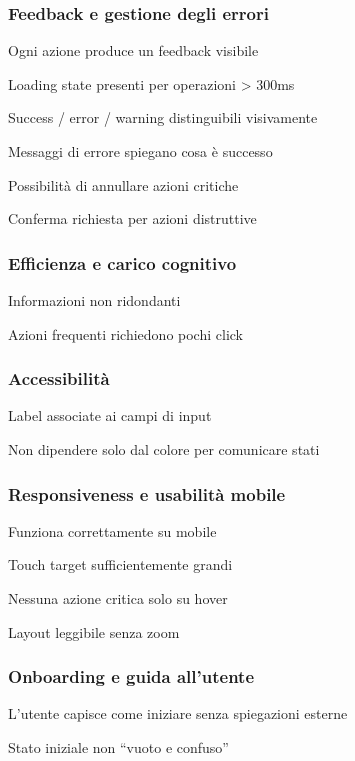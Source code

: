 \subsubsection{Feedback e gestione degli errori}
\begin{todolist}
	\item Ogni azione produce un feedback visibile
	\item Loading state presenti per operazioni > 300ms
	\item Success / error / warning distinguibili visivamente
	\item Messaggi di errore spiegano cosa è successo
	\item Possibilità di annullare azioni critiche
	\item Conferma richiesta per azioni distruttive
\end{todolist}
\subsubsection{Efficienza e carico cognitivo}
\begin{todolist}
\item Informazioni non ridondanti
\item Azioni frequenti richiedono pochi click
\end{todolist}
\subsubsection{Accessibilità}
\begin{todolist}
	\item Label associate ai campi di input
	\item Non dipendere solo dal colore per comunicare stati
\end{todolist}
\subsubsection{Responsiveness e usabilità mobile}
\begin{todolist}
	\item Funziona correttamente su mobile
	\item Touch target sufficientemente grandi
	\item Nessuna azione critica solo su hover
	\item Layout leggibile senza zoom
\end{todolist}
\subsubsection{Onboarding e guida all'utente}
\begin{todolist}
	\item L'utente capisce come iniziare senza spiegazioni esterne
	\item Stato iniziale non ``vuoto e confuso''
\end{todolist}

